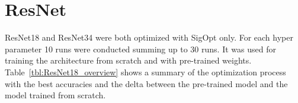 \begin{figure}[!h]
\label{fig:vgg13_heatmap}
\end{figure}

\quad













\section{ResNet}

ResNet18 and ResNet34 were both optimized with SigOpt only. For each hyper parameter 10 runs were conducted summing up to 30 runs. It was used for training the architecture from scratch and with pre-trained weights. Table~\ref{tbl:ResNet18_overview} shows a summary of the optimization process with the best accuracies and the delta between the pre-trained model and the model trained from scratch. \\


